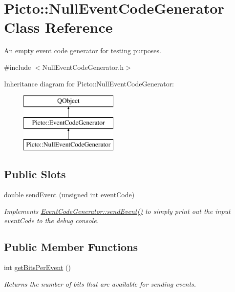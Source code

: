\hypertarget{class_picto_1_1_null_event_code_generator}{\section{Picto\-:\-:Null\-Event\-Code\-Generator Class Reference}
\label{class_picto_1_1_null_event_code_generator}
}


An empty event code generator for testing purposes.  




{\ttfamily \#include $<$Null\-Event\-Code\-Generator.\-h$>$}

Inheritance diagram for Picto\-:\-:Null\-Event\-Code\-Generator\-:\begin{figure}[H]
\begin{center}
\leavevmode
\includegraphics[height=3.000000cm]{class_picto_1_1_null_event_code_generator}
\end{center}
\end{figure}
\subsection*{Public Slots}
\begin{DoxyCompactItemize}
\item 
\hypertarget{class_picto_1_1_null_event_code_generator_a93c6e223c2c9af8b165662f93389da30}{double \hyperlink{class_picto_1_1_null_event_code_generator_a93c6e223c2c9af8b165662f93389da30}{send\-Event} (unsigned int event\-Code)}\label{class_picto_1_1_null_event_code_generator_a93c6e223c2c9af8b165662f93389da30}

\begin{DoxyCompactList}\small\item\em Implements \hyperlink{class_picto_1_1_event_code_generator_adf6a7d68b44bcecec9b7093c723cebb9}{Event\-Code\-Generator\-::send\-Event()} to simply print out the input event\-Code to the debug console. \end{DoxyCompactList}\end{DoxyCompactItemize}
\subsection*{Public Member Functions}
\begin{DoxyCompactItemize}
\item 
int \hyperlink{class_picto_1_1_null_event_code_generator_aad5a36c8ba429abe180f845a3b03c47b}{get\-Bits\-Per\-Event} ()
\begin{DoxyCompactList}\small\item\em Returns the number of bits that are available for sending events. \end{DoxyCompactList}\end{DoxyCompactItemize}


